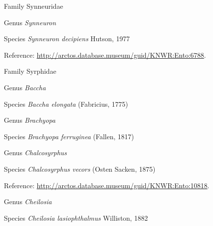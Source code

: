 \documentclass[9pt, article]{memoir}
\begin{document}
\begin{multicols}{2}
\vspace{6pt}\noindent\hspace{24pt}Family Synneuridae


\vspace{6pt}\noindent\hspace{30pt}Genus \textit{Synneuron}


\vspace{6pt}\noindent\hspace{36pt}Species \textit{Synneuron decipiens} Hutson, 1977


\vspace{6pt}Reference: 
\url{http://arctos.database.museum/guid/KNWR:Ento:6788}.

\vspace{6pt}\noindent\hspace{24pt}Family Syrphidae


\vspace{6pt}\noindent\hspace{30pt}Genus \textit{Baccha}


\vspace{6pt}\noindent\hspace{36pt}Species \textit{Baccha elongata} (Fabricius, 1775)


\vspace{6pt}\noindent\hspace{30pt}Genus \textit{Brachyopa}


\vspace{6pt}\noindent\hspace{36pt}Species \textit{Brachyopa ferruginea} (Fallen, 1817)


\vspace{6pt}\noindent\hspace{30pt}Genus \textit{Chalcosyrphus}


\vspace{6pt}\noindent\hspace{36pt}Species \textit{Chalcosyrphus vecors} (Osten Sacken, 1875)


\vspace{6pt}Reference: 
\url{http://arctos.database.museum/guid/KNWR:Ento:10818}.

\vspace{6pt}\noindent\hspace{30pt}Genus \textit{Cheilosia}


\vspace{6pt}\noindent\hspace{36pt}Species \textit{Cheilosia lasiophthalmus} Williston, 1882



\end{multicols}
\end{document}
